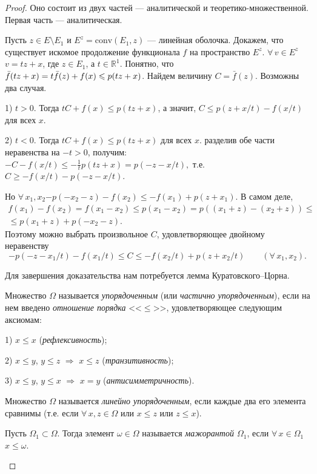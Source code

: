 \documentclass[10pt]{article}
\newcommand*{\p}[1]{#1\nobreak\discretionary{}{\hbox{$\mathsurround=0pt #1$}}{}}
\begin{document}
\begin{proof} Оно состоит из двух частей --- аналитической и
теоре\-ти\-ко-множественной. Первая часть --- аналитическая.

Пусть $z\in E\setminus E_1$ и $E^z=\mathrm{conv}(E_1,z)$
--- линейная оболочка. Докажем, что существует искомое продолжение
функционала $f$ на пространство $E^z$. $\forall\,v\in
E^z$\;\;$v=tz+x$, где $z\in E_1$, а $t\in\mathbb{R}^1$. Понятно, что
$\bar{f}(tz+x)\p=t\bar{f}(z)+f(x)\leqslant p(tz+x)$. Найдем величину
$C=\bar{f}(z)$. Возможны два случая.

1) $t>0$. Тогда $tC+f(x)\leqslant p(tz+x)$, а значит, $C\leqslant
p(z+x/t)-f(x/t)$ для всех $x$.

2) $t<0$. Тогда $tC+f(x)\leqslant p(tz+x)$ для всех $x$. разделив
обе части неравенства на $-t>0$, получим: $-C-f(x/t)\leqslant
-\frac{1}{t}p(tz+x)=p(-z-x/t),$ т.е. $C\geqslant -f(x/t)-p(-z-x/t)$.

Но $\forall\,x_1,x_2$\;\;$-p(-x_2-z)-f(x_2)\leqslant
-f(x_1)+p(z+x_1)$. В самом деле,
\begin{multline*}
f(x_1)-f(x_2)=f(x_1-x_2)\leqslant p(x_1-x_2)=p((x_1+z)-(x_2+z))\leqslant\\
\leqslant p(x_1+z)+p(-x_2-z).
\end{multline*}
Поэтому можно выбрать произвольное $C$, удовлетворяющее двойному
неравенству
$$-p(-z-x_1/t)-f(x_1/t)\leqslant C\leqslant -f(x_2/t)+p(z+x_2/t)\qquad
(\forall\,x_1,x_2).$$

Для завершения доказательства нам потребуется лемма
Куратовско\-го--Цорна.

\begin{df}
Множество $\Omega$ называется \emph{упорядоченным} (или
\emph{частично упорядоченным}), если на нем введено \emph{отношение
порядка} <<$\leqslant$>>, удовлетворяющее следующим аксиомам:

1) $x\leqslant x$ (\emph{рефлексивность});

2) $x\leqslant y$, $y\leqslant z$ $\Rightarrow$ $x\leqslant z$
(\emph{транзитивность});

3) $x\leqslant y$, $y\leqslant x$ $\Rightarrow$ $x=y$
(\emph{антисимметричность}).

Множество $\Omega$ называется \emph{линейно упорядоченным}, если
каждые два его элемента сравнимы (т.е. если $\forall\,x,z\in\Omega$
или $x\leqslant z$ или $z\leqslant x$).

Пусть $\Omega_1\subset\Omega$. Тогда элемент $\omega\in\Omega$
называется \emph{мажорантой $\Omega_1$}, если
$\forall\,x\in\Omega_1$\;\;$x\leqslant\omega$.


\end{df}
\end{proof}
\end{document}
